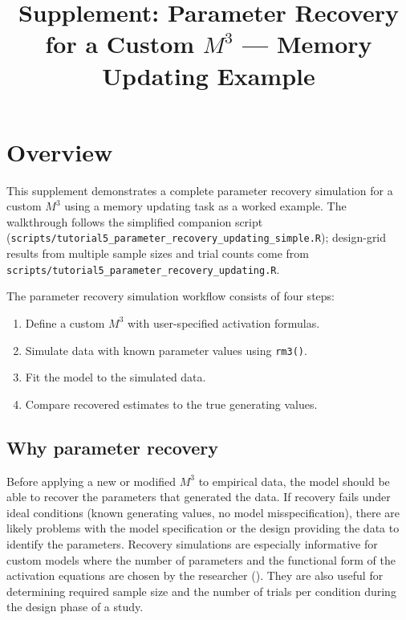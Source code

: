 \documentclass[
  man,
  floatsintext,
  longtable,
  nolmodern,
  notxfonts,
  notimes,
  colorlinks=true,linkcolor=blue,citecolor=blue,urlcolor=blue]{apa7}
\title{Supplement: Parameter Recovery for a Custom \(M^3\) --- Memory
Updating Example}
\providecommand{\tightlist}{%
  \setlength{\itemsep}{0pt}\setlength{\parskip}{0pt}}
\begin{document}
\maketitle




\setlength\LTleft{0pt}




\section{Overview}\label{overview}

This supplement demonstrates a complete parameter recovery simulation
for a custom \(M^3\) using a memory updating task as a worked example.
The walkthrough follows the simplified companion script
(\texttt{scripts/tutorial5\_parameter\_recovery\_updating\_simple.R});
design-grid results from multiple sample sizes and trial counts come
from \texttt{scripts/tutorial5\_parameter\_recovery\_updating.R}.

The parameter recovery simulation workflow consists of four steps:

\begin{enumerate}
\def\labelenumi{\arabic{enumi}.}
\tightlist
\item
  Define a custom \(M^3\) with user-specified activation formulas.
\item
  Simulate data with known parameter values using \texttt{rm3()}.
\item
  Fit the model to the simulated data.
\item
  Compare recovered estimates to the true generating values.
\end{enumerate}

\subsection{Why parameter recovery}\label{why-parameter-recovery}

Before applying a new or modified \(M^3\) to empirical data, the model
should be able to recover the parameters that generated the data. If
recovery fails under ideal conditions (known generating values, no model
misspecification), there are likely problems with the model
specification or the design providing the data to identify the
parameters. Recovery simulations are especially informative for custom
models where the number of parameters and the functional form of the
activation equations are chosen by the researcher
(). They are also
useful for determining required sample size and the number of trials per
condition during the design phase of a study.
\end{document}

